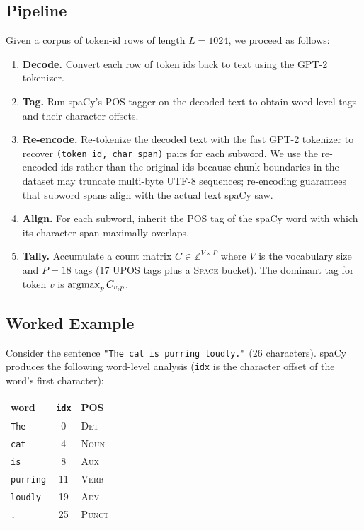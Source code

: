 \documentclass{article}
\begin{document}
\subsection{Pipeline}

Given a corpus of token-id rows of length $L=1024$, we proceed as follows:

\begin{enumerate}
    \item \textbf{Decode.} Convert each row of token ids back to text using the
    GPT-2 tokenizer.
    \item \textbf{Tag.} Run spaCy's POS tagger on the decoded text to obtain
    word-level tags and their character offsets.
    \item \textbf{Re-encode.} Re-tokenize the decoded text with the fast GPT-2
    tokenizer to recover \texttt{(token\_id, char\_span)} pairs for each
    subword. We use the re-encoded ids rather than the original ids because
    chunk boundaries in the dataset may truncate multi-byte UTF-8 sequences;
    re-encoding guarantees that subword spans align with the actual text spaCy
    saw.
    \item \textbf{Align.} For each subword, inherit the POS tag of the spaCy
    word with which its character span maximally overlaps.
    \item \textbf{Tally.} Accumulate a count matrix
    $C \in \mathbb{Z}^{V \times P}$ where $V$ is the vocabulary size and
    $P{=}18$ tags (17 UPOS tags plus a \textsc{Space} bucket). The dominant
    tag for token $v$ is $\operatorname*{argmax}_p C_{v,p}$.
\end{enumerate}

\subsection{Worked Example}

Consider the sentence \texttt{"The cat is purring loudly."} (26 characters).
spaCy produces the following word-level analysis (\texttt{idx} is the
character offset of the word's first character):

\begin{center}
\begin{tabular}{lcl}
\toprule
word & \texttt{idx} & POS \\
\midrule
\texttt{The}     & 0  & \textsc{Det}   \\
\texttt{cat}     & 4  & \textsc{Noun}  \\
\texttt{is}      & 8  & \textsc{Aux}   \\
\texttt{purring} & 11 & \textsc{Verb}  \\
\texttt{loudly}  & 19 & \textsc{Adv}   \\
\texttt{.}       & 25 & \textsc{Punct} \\
\bottomrule
\end{tabular}
\end{center}
\end{document}

